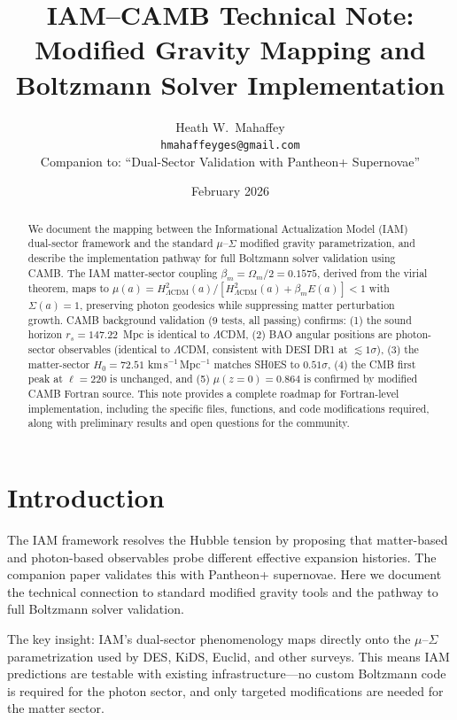 \documentclass[11pt,letterpaper]{article}
\title{IAM--CAMB Technical Note:\\
Modified Gravity Mapping and Boltzmann Solver Implementation}
\author{Heath W.\ Mahaffey\\
\texttt{hmahaffeyges@gmail.com}\\[4pt]
\small{Companion to: ``Dual-Sector Validation with Pantheon+ Supernovae''}}
\date{February 2026}
\begin{document}
\maketitle

\begin{abstract}
We document the mapping between the Informational Actualization Model (IAM) dual-sector framework and the standard $\mu$--$\Sigma$ modified gravity parametrization, and describe the implementation pathway for full Boltzmann solver validation using CAMB. The IAM matter-sector coupling $\beta_m = \Omega_m/2 = 0.1575$, derived from the virial theorem, maps to $\mu(a) = H^2_{\Lambda\text{CDM}}(a) / [H^2_{\Lambda\text{CDM}}(a) + \beta_m E(a)] < 1$ with $\Sigma(a) = 1$, preserving photon geodesics while suppressing matter perturbation growth. CAMB background validation (9 tests, all passing) confirms: (1) the sound horizon $r_s = 147.22$~Mpc is identical to $\Lambda$CDM, (2) BAO angular positions are photon-sector observables (identical to $\Lambda$CDM, consistent with DESI DR1 at $\lesssim 1\sigma$), (3) the matter-sector $H_0 = 72.51$ km\,s$^{-1}$\,Mpc$^{-1}$ matches SH0ES to $0.51\sigma$, (4) the CMB first peak at $\ell = 220$ is unchanged, and (5) $\mu(z=0) = 0.864$ is confirmed by modified CAMB Fortran source. This note provides a complete roadmap for Fortran-level implementation, including the specific files, functions, and code modifications required, along with preliminary results and open questions for the community.
\end{abstract}

\tableofcontents

\section{Introduction}

The IAM framework resolves the Hubble tension by proposing that matter-based and photon-based observables probe different effective expansion histories. The companion paper \cite{DualSector2026} validates this with Pantheon+ supernovae. Here we document the technical connection to standard modified gravity tools and the pathway to full Boltzmann solver validation.

The key insight: IAM's dual-sector phenomenology maps directly onto the $\mu$--$\Sigma$ parametrization used by DES, KiDS, Euclid, and other surveys. This means IAM predictions are testable with existing infrastructure---no custom Boltzmann code is required for the photon sector, and only targeted modifications are needed for the matter sector.
\end{document}
